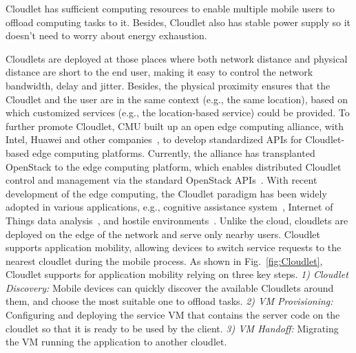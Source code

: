 Cloudlet has sufficient computing resources to enable multiple mobile users to offload computing tasks to it. Besides, Cloudlet also has stable power supply so it doesn't need to worry about energy exhaustion.

Cloudlets are deployed at those places where both network distance and physical distance are short to the end user, making it easy to control the network bandwidth, delay and jitter. Besides, the physical proximity ensures that the Cloudlet and the user are in the same context (e.g., the same location), based on which customized services (e.g., the location-based service) could be provided.
To further promote Cloudlet, CMU built up an open edge computing alliance, with Intel, Huawei and other companies~, to develop standardized APIs for Cloudlet-based edge computing platforms. Currently, the alliance has transplanted OpenStack to the edge computing platform, which enables distributed Cloudlet control and management via the standard OpenStack APIs~. With recent development of the edge computing, the Cloudlet paradigm has been widely adopted in various applications, e.g., cognitive assistance system~, Internet of Things data analysis~, and hostile environments~. 
Unlike the cloud, cloudlets are deployed on the edge of the network and serve only nearby users. Cloudlet supports application mobility, allowing devices to switch service requests to the nearest cloudlet during the mobile process. As shown in Fig.~\ref{fig:Cloudlet}, Cloudlet supports for application mobility relying on three key steps.
\textit{1) Cloudlet Discovery:} 
Mobile devices can quickly discover the available Cloudlets around them, and choose the most suitable one to offload tasks.
\textit{2) VM Provisioning:}
Configuring and deploying the service VM that contains the server code on the cloudlet so that it is ready to be used by the client.
\textit{3) VM Handoff:}
Migrating the VM running the application to another cloudlet.

